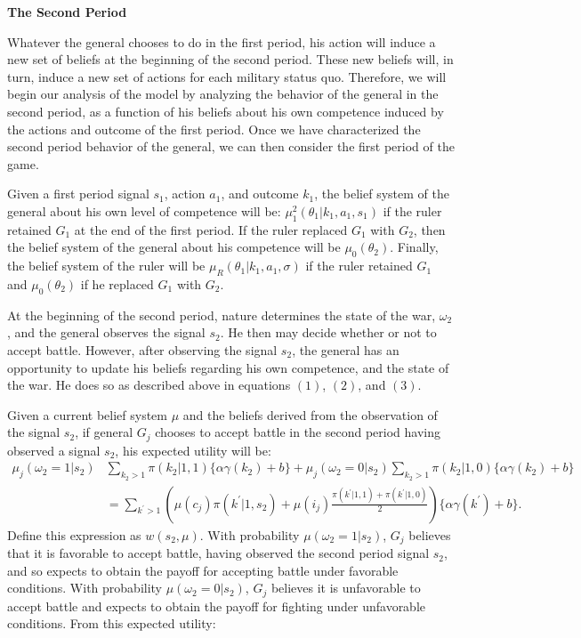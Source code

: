 \documentclass[11pt,]{article}
\begin{document}
\begin{center}
\textbf{\Large{The Second Period}}\normalsize\\
\end{center}

\noindent Whatever the general chooses to do in the first period, his action will induce a new set of beliefs at the beginning of the second period.  These new beliefs will, in turn, induce a new set of actions for each military status quo.  Therefore, we will begin our analysis of the model by analyzing the behavior of the general in the second period, as a function of his beliefs about his own competence induced by the actions and outcome of the first period.  Once we have characterized the second period behavior of the general, we can then consider the first period of the game.  



Given a first period signal $s_1$, action $a_1$, and outcome $k_1$, the belief system of the general about his own level of competence will be: $\mu_1^2(\theta_1|k_1,a_1,s_1)$ if the ruler retained $G_1$ at the end of the first period.  If the ruler replaced $G_1$ with $G_2$, then the belief system of the general about his competence will be $\mu_0(\theta_2)$.  Finally, the belief system of the ruler will be $\mu_R(\theta_1|k_1,a_1,\sigma)$ if the ruler retained $G_1$ and $\mu_0(\theta_2)$ if he replaced $G_1$ with $G_2$.

At the beginning of the second period, nature determines the state of the war, $\omega_2$, and the general observes the signal $s_2$.  He then may decide whether or not to accept battle.  However, after observing the signal $s_2$, the general has an opportunity to update his beliefs regarding his own competence, and the state of the war.  He does so as described above in equations $(1)$, $(2)$, and $(3)$.



Given a current belief system $\mu$ and the beliefs derived from the observation of the signal $s_2$, if general $G_j$ chooses to accept battle in the second period having observed a signal $s_2$, his expected utility will be:
\begin{align*}
\mu_j(\omega_2=1|s_2)&\sum_{k_2>1}\pi(k_2|1,1)\{\alpha\gamma(k_2)+b\}+\mu_j(\omega_2=0|s_2)\sum_{k_2>1}\pi(k_2|1,0)\{\alpha\gamma(k_2)+b\}\\
&=\sum_{k^{\prime}>1}\left(\mu(c_j)\pi(k^{\prime}|1,s_2)+\mu(i_j)\frac{\pi(k^{\prime}|1,1)+\pi(k^{\prime}|1,0)}{2}\right)\{\alpha\gamma(k^{\prime})+b\}.
\end{align*}Define this expression as $w(s_2,\mu)$.  With probability $\mu(\omega_2=1|s_2)$, $G_j$ believes that it is favorable to accept battle, having observed the second period signal $s_2$, and so expects to obtain the payoff for accepting battle under favorable conditions.  With probability $\mu(\omega_2=0|s_2)$, $G_j$ believes it is unfavorable to accept battle and expects to obtain the payoff for fighting under unfavorable conditions.  From this expected utility:
\end{document}
